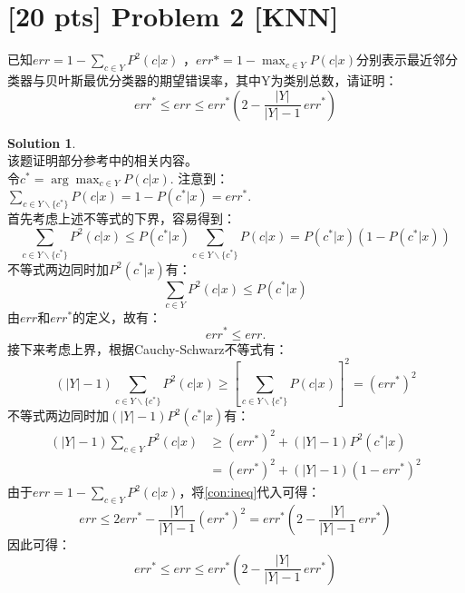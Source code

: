 \documentclass[a4paper,UTF8]{article}
\theoremstyle{definition}
\newtheorem*{solution}{Solution}
\begin{document}
\section*{[20 pts] Problem 2 [KNN]}
已知$err=1-\sum_{c \in Y}P^2(c|x)$
，$err*=1-\max_{c \in Y}P(c|x)$分别表示最近邻分类器与贝叶斯最优分类器的期望错误率，其中Y为类别总数，请证明：\begin{equation*}err^* \leqslant err \leqslant err^*(2-\frac{|Y|}{|Y|-1}\,	err^*)\end{equation*}

\begin{solution}
~\\该题证明部分参考\cite{1053964}中的相关内容。\\令$c^* = \arg\max_{c\in Y}P(c|x)$. 注意到：$\sum_{c \in Y\backslash\{c^*\}} P(c|x) = 1 - P(c^*|x) = err^*$.\\
首先考虑上述不等式的下界，容易得到：
$$\sum_{c \in Y\backslash\{c^*\}}P^2(c|x)\leqslant P(c^*|x)\sum_{c \in Y\backslash\{c^*\}} P(c|x) = P(c^*|x)(1-P(c^*|x))$$
不等式两边同时加$P^2(c^*|x)$有：
$$\sum_{c \in Y}P^2(c|x)\leqslant P(c^*|x)$$
由$err$和$err^*$的定义，故有：$$err^*\leqslant err.$$
接下来考虑上界，根据Cauchy-Schwarz不等式有：
$$(|Y|-1)\sum_{c \in Y\backslash\{c^*\}}P^2(c|x)\geqslant \left[\sum_{c \in Y\backslash\{c^*\}}P(c|x)\right]^2 = \left(err^*\right)^2$$
不等式两边同时加$(|Y|-1)P^2(c^*|x)$有：
\begin{equation}
\begin{aligned}
(|Y|-1)\sum_{c \in Y}P^2(c|x)&\geqslant\left(err^*\right)^2+(|Y|-1)P^2(c^*|x)\\&=\left(err^*\right)^2+(|Y|-1)(1-err^*)^2\label{con:ineq}
\end{aligned}
\end{equation}
由于$err=1-\sum_{c \in Y}P^2(c|x)$，将\eqref{con:ineq}代入可得：
$$err\leqslant 2err^*-\frac{|Y|}{|Y|-1}(err^*)^2 = err^*(2-\frac{|Y|}{|Y|-1}\,	err^*)$$
因此可得：\begin{equation*}err^* \leqslant err \leqslant err^*(2-\frac{|Y|}{|Y|-1}\,	err^*)\end{equation*}	
\end{solution}
\end{document}
